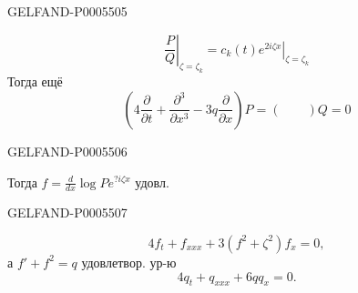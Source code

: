 \begin{GelfandAdjacentEvidence}{GELFAND-P000550}{5}

\[
\left.\frac P Q\right|_{\zeta=\zeta_k}
=\left.c_k(t)e^{2i\zeta x}\right|_{\zeta=\zeta_k}
\]
Тогда ещё
\[
\left(4\frac{\partial}{\partial t}+\frac{\partial^3}{\partial x^3}
-3q\frac{\partial}{\partial x}\right)P=(\qquad)Q=0
\]
\end{GelfandAdjacentEvidence}
\begin{GelfandAdjacentEvidence}{GELFAND-P000550}{6}


Тогда \(f=\frac{d}{dx}\log P e^{?i\zeta x}\) удовл.
\end{GelfandAdjacentEvidence}
\begin{GelfandAdjacentEvidence}{GELFAND-P000550}{7}

\[
4f_t+f_{xxx}+3(f^2+\zeta^2)f_x=0,
\]
а \(f'+f^2=q\) удовлетвор. ур-ю
\[
4q_t+q_{xxx}+6qq_x=0.
\]
\end{GelfandAdjacentEvidence}



